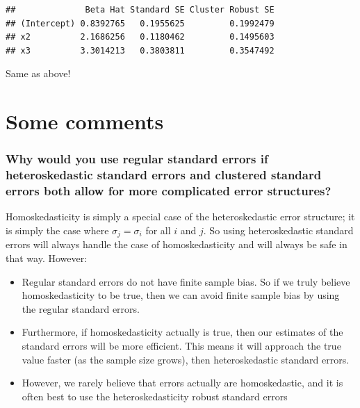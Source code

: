 \documentclass[]{article}
\providecommand{\tightlist}{%
  \setlength{\itemsep}{0pt}\setlength{\parskip}{0pt}}
\begin{document}
\begin{verbatim}
##              Beta Hat Standard SE Cluster Robust SE
## (Intercept) 0.8392765   0.1955625         0.1992479
## x2          2.1686256   0.1180462         0.1495603
## x3          3.3014213   0.3803811         0.3547492
\end{verbatim}

Same as above!

\hypertarget{some-comments}{%
\section{Some comments}\label{some-comments}}

\hypertarget{why-would-you-use-regular-standard-errors-if-heteroskedastic-standard-errors-and-clustered-standard-errors-both-allow-for-more-complicated-error-structures}{%
\subsubsection{Why would you use regular standard errors if
heteroskedastic standard errors and clustered standard errors both allow
for more complicated error
structures?}\label{why-would-you-use-regular-standard-errors-if-heteroskedastic-standard-errors-and-clustered-standard-errors-both-allow-for-more-complicated-error-structures}}

Homoskedasticity is simply a special case of the heteroskedastic error
structure; it is simply the case where \(\sigma_j = \sigma_i\) for all
\(i\) and \(j\). So using heteroskedastic standard errors will always
handle the case of homoskedasticity and will always be safe in that way.
However:

\begin{itemize}
\tightlist
\item
  Regular standard errors do not have finite sample bias. So if we truly
  believe homoskedasticity to be true, then we can avoid finite sample
  bias by using the regular standard errors.
\item
  Furthermore, if homoskedasticity actually is true, then our estimates
  of the standard errors will be more efficient. This means it will
  approach the true value faster (as the sample size grows), then
  heteroskedastic standard errors.
\item
  However, we rarely believe that errors actually are homoskedastic, and
  it is often best to use the heteroskedasticity robust standard errors
\end{itemize}
\end{document}
